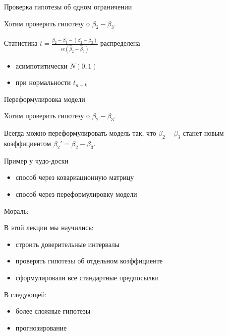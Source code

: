 \documentclass[ignorenonframetext,]{beamer}
\begin{document}
\begin{frame}{Проверка гипотезы об одном ограничении}

Хотим проверить гипотезу о $\beta_2-\beta_3$.

Статистика
$t=\frac{\hat{\beta}_2-\hat{\beta}_3-(\beta_2-\beta_3)}{se(\hat{\beta}_2-\hat{\beta}_3)}$
распределена

\begin{itemize}
\item
  асимпотитически $N(0,1)$
\item
  при нормальности $t_{n-k}$
\end{itemize}

\end{frame}

\begin{frame}{Переформулировка модели}

Хотим проверить гипотезу о $\beta_2-\beta_3$.

Всегда можно переформулировать модель так, что $\beta_2-\beta_3$ станет
новым коэффициентом $\beta_2'=\beta_2-\beta_3$.

\end{frame}

\begin{frame}{Пример у чудо-доски}

\begin{itemize}
\item
  способ через ковариационную матрицу
\item
  способ через переформулировку модели
\end{itemize}

\end{frame}

\begin{frame}{Мораль:}

В этой лекции мы научились:

\begin{itemize}
\item
  строить доверительные интервалы
\item
  проверять гипотезы об отдельном коэффициенте
\item
  сформулировали все стандартные предпосылки
\end{itemize}

В следующей:

\begin{itemize}
\item
  более сложные гипотезы
\item
  прогнозирование
\end{itemize}

\end{frame}
\end{document}
